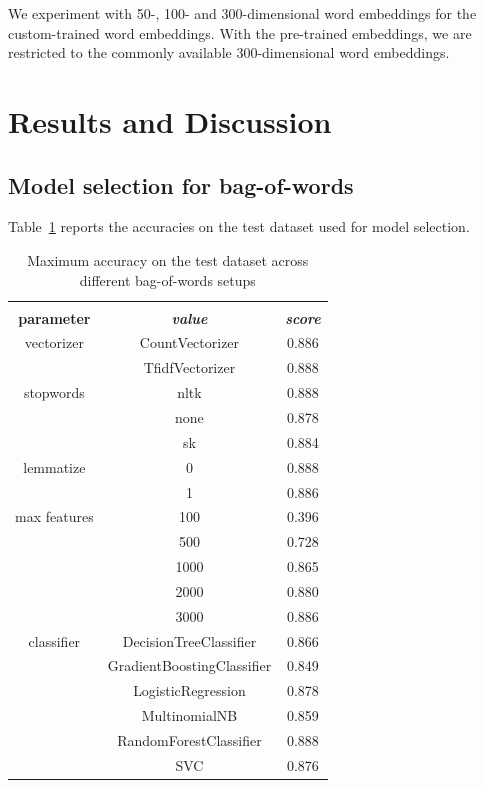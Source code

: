 \documentclass[conference]{IEEEtran}
\begin{document}
We experiment with 50-, 100- and 300-dimensional word embeddings for the custom-trained word embeddings. With the pre-trained embeddings, we are restricted to the commonly available 300-dimensional word embeddings.


\section{Results and Discussion}

\subsection{Model selection for bag-of-words}
Table~\ref{tab5} reports the accuracies on the test dataset used for model selection.
\begin{table}[htbp]
\caption{Maximum accuracy on the test dataset across different bag-of-words setups}
\begin{center}
\begin{tabular}{|c|c|c|}
\hline
\textbf{}&\multicolumn{2}{|c|}{\textbf{}} \\ 
\cline{2-3}
\textbf{parameter} & \textbf{\textit{value}}& \textbf{\textit{score}} \\ 
\hline
vectorizer & CountVectorizer & 0.886 \\ 
\cline{2-3}
 & TfidfVectorizer & 0.888 \\ 
\hline
stopwords & nltk & 0.888 \\ 
\cline{2-3}
 & none & 0.878 \\ 
\cline{2-3}
 & sk & 0.884 \\ 
\hline
lemmatize & 0 & 0.888 \\ 
\cline{2-3}
 & 1 & 0.886 \\ 
\hline
max features  & 100 & 0.396 \\ 
\cline{2-3}
  & 500 & 0.728 \\ 
\cline{2-3}
 & 1000 & 0.865 \\ 
\cline{2-3}
  & 2000 & 0.880 \\ 
\cline{2-3}
  & 3000 & 0.886 \\ 
\hline
classifier & DecisionTreeClassifier & 0.866 \\ 
\cline{2-3}
 & GradientBoostingClassifier & 0.849 \\ 
\cline{2-3}
 & LogisticRegression & 0.878 \\ 
\cline{2-3}
 & MultinomialNB & 0.859 \\ 
\cline{2-3}
 & RandomForestClassifier & 0.888 \\ 
\cline{2-3}
 & SVC & 0.876 \\ 
\hline
\end{tabular}
\label{tab5}
\end{center}
\end{table}
\end{document}
